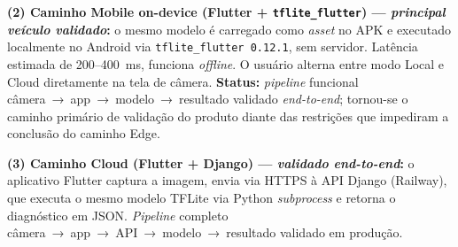\documentclass[12pt]{article}
\begin{document}
\textbf{(2) Caminho Mobile on-device (Flutter + \texttt{tflite\_flutter}) ---
\textit{principal veículo validado}:} o mesmo modelo é carregado como
\textit{asset} no APK e executado localmente no Android via
\texttt{tflite\_flutter~0.12.1}, sem servidor. Latência estimada de 200--400~ms,
funciona \textit{offline}. O usuário alterna entre modo Local e Cloud diretamente
na tela de câmera. \textbf{Status:} \textit{pipeline} funcional câmera~→~app~→~modelo~→~resultado
validado \textit{end-to-end}; tornou-se o caminho primário de validação do produto
diante das restrições que impediram a conclusão do caminho Edge.

\textbf{(3) Caminho Cloud (Flutter + Django) --- \textit{validado end-to-end}:} o
aplicativo Flutter captura a imagem, envia via HTTPS à API Django (Railway), que
executa o mesmo modelo TFLite via Python \textit{subprocess} e retorna o
diagnóstico em JSON. \textit{Pipeline} completo câmera~→~app~→~API~→~modelo~→~resultado
validado em produção.
\end{document}
